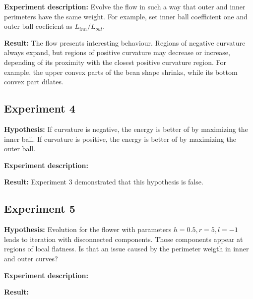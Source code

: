 \textbf{Experiment description:} Evolve the flow in such a way that outer and inner perimeters have the same weight. For example, set inner ball coefficient one and outer  ball coeficient as $L_{inn}/L_{out}$.

\textbf{Result:} The flow presents interesting behaviour. Regions of negative curvature always expand, but regions of positive curvature may decrease or increase, depending of its proximity with the closest positive curvature region. For example, the upper convex parts of the bean shape shrinks, while its bottom convex part dilates.


\subsection{Experiment 4}

\textbf{Hypothesis:} If curvature is negative, the energy is better of by maximizing the inner ball. If curvature is positive, the energy is  better of by maximizing the outer ball.


\textbf{Experiment description:}


\textbf{Result:} Experiment 3 demonstrated that this hypothesis is false.



\subsection{Experiment 5}

\textbf{Hypothesis:} Evolution for the flower with parameters $h=0.5,r=5,l=-1$ leads to iteration with disconnected components. Those components appear at regions of local flatness. Is that an issue caused by the perimeter weigth in inner and outer curves?


\textbf{Experiment description:}


\textbf{Result:}